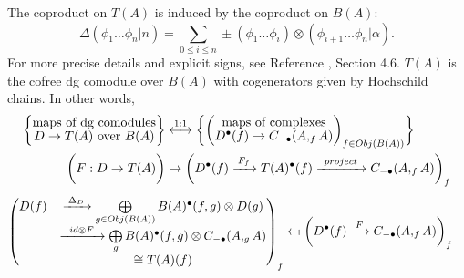 %
The coproduct on $T(A)$ is induced by the 
coproduct on $B(A)$:
$$\Delta(\phi_1\dots \phi_n|n) = 
\sum \limits_{0 \leq i \leq n}
\pm (\phi_1 \dots \phi_i) \otimes (\phi_{i+1}\dots \phi_n|\alpha).$$
%
For more precise details and explicit signs, 
see Reference \cite{T}, Section 4.6. 
$T(A)$ is the cofree dg comodule over $B(A)$ with 
cogenerators given by Hochschild chains. 
In other words, 
\begin{equation*}
\begin{split}
\bigg\{ \let\scriptstyle\textstyle
\substack{\textrm{maps of dg comodules}\\
  D \to T(A) \textrm{ over }B(A)} 
\bigg\}
&\overset{1:1}{\longleftrightarrow}
\bigg\{ \bigg( \let\scriptstyle\textstyle
\substack{\textrm{maps of complexes}\\
  D^\bullet(f) \to C_{-\bullet}(A, _fA)}
\bigg)_{f \in Obj(B(A))} \bigg\}\\
%
\bigg( F:D\to T(A) \bigg)
&\mapsto
\bigg(
  D^\bullet(f) 
  \xrightarrow{F_f} T(A)^\bullet(f)
  \xrightarrow{project}
  C_{-\bullet}(A, _fA)
\bigg)_f
\end{split}
\end{equation*}
\begin{align*}  
\begin{pmatrix}
  D(f)
  &\xrightarrow{\Delta_D}
  \bigoplus \limits_{g \in Obj(B(A))}
  B(A)^\bullet(f,g) \otimes D(g)\\
  &\xrightarrow{id \otimes F}
  \bigoplus \limits_g
  B(A)^\bullet(f,g) \otimes C_{-\bullet}(A, _gA)\\
  &\cong T(A)(f)
  \end{pmatrix} _f
&\leftmapsto  
\bigg( D^\bullet(f) \xrightarrow{F}
  C_{-\bullet}(A, _fA)
  \bigg)_f
\end{align*}